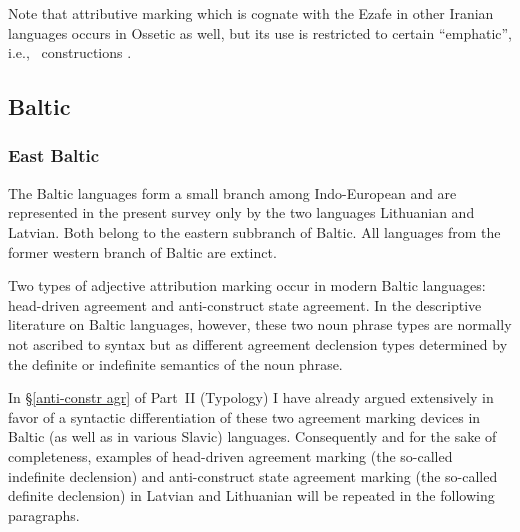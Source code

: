 Note that attributive  marking which is cognate with the Ezafe in other Iranian languages occurs in Ossetic as well, but its use is restricted to certain “emphatic”, i.e.,~ constructions \cite[467]{thodarson1989}.

\subsection{Baltic} \label{baltic synchr}
\subsubsection{East Baltic}
The Baltic languages form a small branch among Indo-European and are represented in the present survey only by the two languages Lithuanian and Latvian. Both belong to the eastern subbranch of Baltic. All languages from the former western branch of Baltic are extinct.

Two types of adjective attribution marking occur in modern Baltic languages: head\hyp{}driven agreement and anti\hyp{}construct state agreement. In the descriptive literature on Baltic languages, however, these two noun phrase types are normally not ascribed to syntax but as different agreement declension types determined by the definite or indefinite semantics of the noun phrase.

In \S\ref{anti-constr agr} of Part~II (Typology) I have already argued extensively in favor of a syntactic differentiation of these two agreement marking devices in Baltic (as well as in various Slavic) languages. Consequently and for the sake of completeness, examples of head\hyp{}driven agreement marking (the so-called indefinite declension) and anti\hyp{}construct state agreement marking (the so-called definite declension) in Latvian and Lithuanian will be repeated in the following paragraphs.

